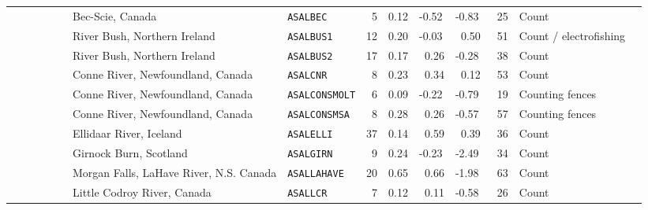 \begin{flushleft}
\begin{tabular*}{7.1in}{llllllllll}
&~~~~~~~~~Bec-Scie, Canada&{\tt ASALBEC}&~5&0.12&-0.52&-0.83&~25&Count  & \\ 
&~~~~~~~~~River Bush, Northern Ireland&{\tt ASALBUS1}&12&0.20&-0.03&~0.50&~51&Count / electrofishing  & \\ 
&~~~~~~~~~River Bush, Northern Ireland&{\tt ASALBUS2}&17&0.17&~0.26&-0.28&~38&Count  & \\ 
&~~~~~~~~~Conne River, Newfoundland, Canada&{\tt ASALCNR}&~8&0.23&~0.34&~0.12&~53&Count  & \\ 
&~~~~~~~~~Conne River, Newfoundland, Canada&{\tt ASALCONSMOLT}&~6&0.09&-0.22&-0.79&~19&Counting fences  & \\ 
&~~~~~~~~~Conne River, Newfoundland, Canada&{\tt ASALCONSMSA}&~8&0.28&~0.26&-0.57&~57&Counting fences  & \\ 
&~~~~~~~~~Ellidaar River, Iceland&{\tt ASALELLI}&37&0.14&~0.59&~0.39&~36&Count  & \\ 
&~~~~~~~~~Girnock Burn, Scotland&{\tt ASALGIRN}&~9&0.24&-0.23&-2.49&~34&Count  & \\ 
&~~~~~~~~~Morgan Falls, LaHave River, N.S. Canada&{\tt ASALLAHAVE}&20&0.65&~0.66&-1.98&~63&Count  & \\ 
&~~~~~~~~~Little Codroy River, Canada&{\tt ASALLCR}&~7&0.12&~0.11&-0.58&~26&Count  & \\ 
\end{tabular*} 
\end{flushleft}
\newpage
